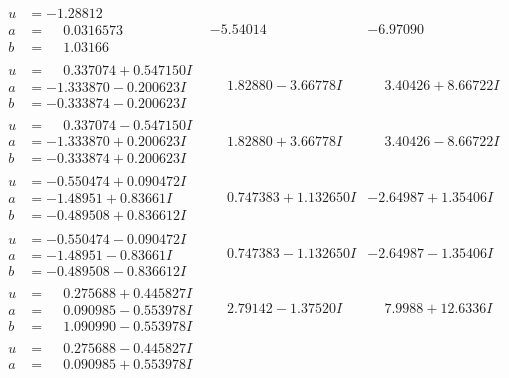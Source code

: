 \documentclass[1p]{elsarticle_modified}
\theoremstyle{definition}
\begin{document}
$$\begin{array}{c|c|c}
\begin{aligned}
u &= -1.28812\phantom{ +0.000000I} \\
a &= \phantom{-}0.0316573\phantom{ +0.000000I} \\
b &= \phantom{-}1.03166\phantom{ +0.000000I}\end{aligned}
 & -5.54014\phantom{ +0.000000I} & -6.97090\phantom{ +0.000000I} \\ \hline\begin{aligned}
u &= \phantom{-}0.337074 + 0.547150 I \\
a &= -1.333870 - 0.200623 I \\
b &= -0.333874 - 0.200623 I\end{aligned}
 & \phantom{-}1.82880 - 3.66778 I & \phantom{-}3.40426 + 8.66722 I \\ \hline\begin{aligned}
u &= \phantom{-}0.337074 - 0.547150 I \\
a &= -1.333870 + 0.200623 I \\
b &= -0.333874 + 0.200623 I\end{aligned}
 & \phantom{-}1.82880 + 3.66778 I & \phantom{-}3.40426 - 8.66722 I \\ \hline\begin{aligned}
u &= -0.550474 + 0.090472 I \\
a &= -1.48951 + 0.83661 I \\
b &= -0.489508 + 0.836612 I\end{aligned}
 & \phantom{-}0.747383 + 1.132650 I & -2.64987 + 1.35406 I \\ \hline\begin{aligned}
u &= -0.550474 - 0.090472 I \\
a &= -1.48951 - 0.83661 I \\
b &= -0.489508 - 0.836612 I\end{aligned}
 & \phantom{-}0.747383 - 1.132650 I & -2.64987 - 1.35406 I \\ \hline\begin{aligned}
u &= \phantom{-}0.275688 + 0.445827 I \\
a &= \phantom{-}0.090985 - 0.553978 I \\
b &= \phantom{-}1.090990 - 0.553978 I\end{aligned}
 & \phantom{-}2.79142 - 1.37520 I & \phantom{-}7.9988 + 12.6336 I \\ \hline\begin{aligned}
u &= \phantom{-}0.275688 - 0.445827 I \\
a &= \phantom{-}0.090985 + 0.553978 I \\

\end{aligned}
\end{array}$$
\end{document}
